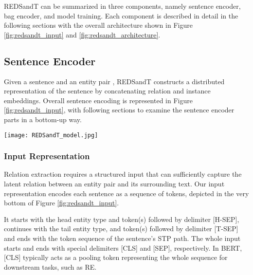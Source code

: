 \documentclass[11pt,a4paper]{article}
\begin{document}
REDSandT can be summarized in three components, namely sentence encoder, bag encoder, and model training. Each component is described in detail in the following sections with the overall architecture shown in Figure \ref{fig:redsandt_input} and \ref{fig:redsandt_architecture}.


\subsection{Sentence Encoder}
Given a sentence  and an entity pair , REDSandT constructs a distributed representation of the sentence by concatenating relation and instance embeddings. Overall sentence encoding is represented in Figure \ref{fig:redsandt_input}, with following sections to examine the sentence encoder parts in a bottom-up way.

\begin{figure*}
    \centering
    \texttt{[image: REDSandT\_model.jpg]}
    \caption{Sentence Representation in REDSandT. The input embedding  to BERT is created by summing over the positional and byte pair embeddings for each token in the structured input. States  are obtained by self-attending over the states of the previous layer . Final sentence representation is obtained by concatenating the relation embedding , and the final fine-tuned BERT layer  weighted with relation attention . Head and tail tokens participating in the relation embedding formation are marked with bold and dashed lines respectively.}
    \label{fig:redsandt_input}
    \vspace{-4mm}
\end{figure*}


\subsubsection{Input Representation}
\label{subsec:inputRepresentation}
Relation extraction requires a structured input that can sufficiently capture the latent relation between an entity pair and its surrounding text. Our input representation encodes each sentence as a sequence of tokens, depicted in the very bottom of Figure \ref{fig:redsandt_input}. 

It starts with the head entity type and token(s) followed by delimiter [H-SEP], continues with the tail entity type, and token(s) followed by delimiter [T-SEP] and ends with the token sequence of the sentence's STP path. The whole input starts and ends with special delimiters [CLS] and [SEP], respectively. In BERT, [CLS] typically acts as a pooling token representing the whole sequence for downstream tasks, such as RE. 
\end{document}
